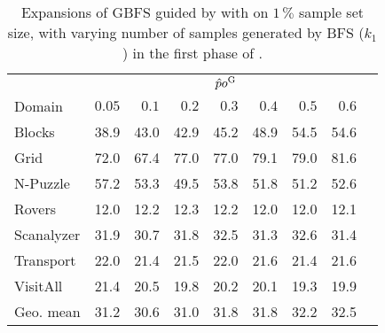 \begin{table}[!h]
\centering
\caption[Expansions of \pog with varying values of $k_{1}$]{Expansions of GBFS guided by \hnn with \pog on $1\,\%$ sample set size, with varying number of samples generated by BFS ($k_{1}$) in the first phase of \bfsrs.}
\label{tab:bfsss_pct}
\vspace{\baselineskip}
\begin{tabular}{lrrrrrrrr}
\toprule
& \multicolumn{7}{c}{$\hat po^{\text{G}}$} \\
\cmidrule(lr){2-8}
Domain     & $0.05$ &$0.1$ & $0.2$   & $0.3$ & $0.4$ & $0.5$ & $0.6$ \\ \midrule
Blocks     & 38.9   & 43.0  & 42.9  & 45.2  & 48.9  & 54.5  & 54.6  \\
Grid       & 72.0   & 67.4  & 77.0  & 77.0  & 79.1  & 79.0  & 81.6  \\
N-Puzzle   & 57.2   & 53.3  & 49.5  & 53.8  & 51.8  & 51.2  & 52.6  \\
Rovers     & 12.0   & 12.2  & 12.3  & 12.2  & 12.0  & 12.0  & 12.1  \\
Scanalyzer & 31.9   & 30.7  & 31.8  & 32.5  & 31.3  & 32.6  & 31.4  \\
Transport  & 22.0   & 21.4  & 21.5  & 22.0  & 21.6  & 21.4  & 21.6  \\
VisitAll   & 21.4   & 20.5  & 19.8  & 20.2  & 20.1  & 19.3  & 19.9  \\ \midrule
Geo. mean  & 31.2   & 30.6  & 31.0  & 31.8  & 31.8  & 32.2  & 32.5  \\ \bottomrule
\end{tabular}
\end{table}
